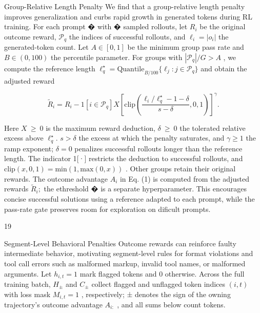 \documentclass[
  10
]{article}
\begin{document}
Group-Relative Length Penalty We find that a group-relative length
penalty improves generalization and curbs rapid growth in generated
tokens during RL training. For each prompt � with � sampled rollouts,
let \(R _ { i }\) be the original outcome reward,
\(\mathcal { P } _ { q }\) the indices of successful rollouts, and
\(\ell _ { i } = | o _ { i } |\) the generated-token count. Let
\(A \in [ 0 , 1 ]\) be the minimum group pass rate and
\(B \in ( 0 , 1 0 0 )\) the percentile parameter. For groups with
\(| { \mathcal { P } } _ { q } | / G > A\) , we compute the reference
length
\(\ell _ { q } ^ { \star } = \mathrm { Q u a n t i l e } _ { B / 1 0 0 } \{ \ell _ { j } : j \in \mathcal { P } _ { q } \}\)
and obtain the adjusted reward

\[
\widetilde { R } _ { i } = R _ { i } - 1 \left[ i \in \mathcal { P } _ { q } \right] X \left[ \mathrm { c l i p } \left( \frac { \ell _ { i } / \ell _ { q } ^ { \star } - 1 - \delta } { s - \delta } , 0 , 1 \right) \right] ^ { \gamma } .\tag{4}
\]

Here \(X ~ \geq ~ 0\) is the maximum reward deduction,
\(\delta \ \geq \ 0\) the tolerated relative excess above
\(\ell _ { q } ^ { \star } .\) \(s > \delta\) the excess at which the
penalty saturates, and \(\gamma \geq 1\) the ramp exponent;
\(\delta = 0\) penalizes successful rollouts longer than the reference
length. The indicator 1{[}·{]} restricts the deduction to successful
rollouts, and
\(\mathrm { c l i p } ( x , 0 , 1 ) = \mathrm { m i n } ( 1 , \mathrm { m a x } ( 0 , x ) )\)
. Other groups retain their original rewards. The outcome advantage
\(A _ { i }\) in Eq. (1) is computed from the adjusted rewards
\(\widetilde { R } _ { i } ;\) the ethreshold � is a separate
hyperparameter. This encourages concise successful solutions using a
reference adapted to each prompt, while the pass-rate gate preserves
room for exploration on dificult prompts.

19

Segment-Level Behavioral Penalties Outcome rewards can reinforce faulty
intermediate behavior, motivating segment-level rules for format
violations and tool call errors such as malformed markup, invalid tool
names, or malformed arguments. Let \(h _ { i , t } = 1\) mark flagged
tokens and 0 otherwise. Across the full training batch, \(H _ { \pm }\)
and \(C _ { \pm }\) collect flagged and unflagged token indices
\(( i , t )\) with loss mask \(M _ { i , t } = 1\) , respectively; ±
denotes the sign of the owning trajectory's outcome advantage
\(A _ { i : }\) , and all sums below count tokens.
\end{document}

